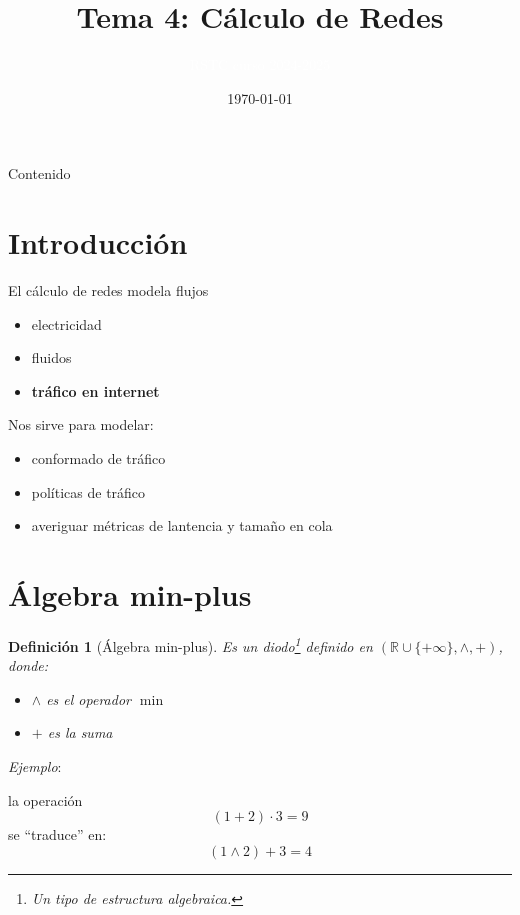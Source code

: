 \documentclass[xcolor={x11names}]{beamer}
\title[Tema 4]{Tema 4: Cálculo de Redes}
\author{\textcolor{white}{RSTC curso 2024-2025}}
\date{\today}
\newtheorem{definicion}{Definición}[section]
\begin{document}
\frame{\titlepage }


\begin{frame}[allowframebreaks]{Contenido}
    \tableofcontents
\end{frame}




\section{Introducción}
\begin{frame}{\secname}
    El cálculo de redes modela flujos
    \begin{itemize}
        \item electricidad
        \item fluidos
        \item \textbf{tráfico en internet}
    \end{itemize}

    \vfill
    Nos sirve para modelar:
    \begin{itemize}
        \item conformado de tráfico
        \item políticas de tráfico
        \item averiguar métricas de
            lantencia y tamaño en cola
    \end{itemize}
\end{frame}



\section{Álgebra min-plus}
\begin{frame}{\secname}
    \begin{definicion}[Álgebra min-plus]
        Es un diodo\footnote{Un tipo de
        estructura algebraica.}
        definido en
        $(\mathbb{R}\cup \{+\infty\},
        \land, +)$, donde:
        \begin{itemize}
            \item $\land$ es el operador
                $\min$
            \item $+$ es la suma
        \end{itemize}
    \end{definicion}

    \vfill

    \emph{Ejemplo}:

    la operación
    \begin{equation*}
        (1+2)\cdot 3 = 9
    \end{equation*}
    se ``traduce'' en:
    \begin{equation*}
        (1\land2)+ 3 = 4
    \end{equation*}
\end{frame}
\end{document}
